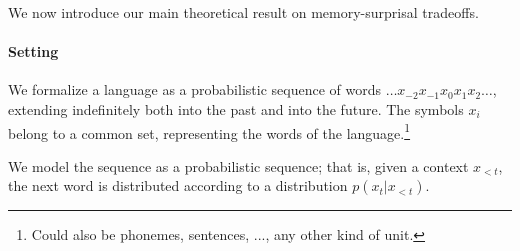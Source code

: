 \documentclass[11pt,letterpaper]{article}
\begin{document}
We now introduce our main theoretical result on memory-surprisal tradeoffs.

\paragraph{Setting}
We formalize a language as a probabilistic sequence of words $\dots x_{-2} x_{-1} x_0 x_{1} x_{2} \dots$, extending indefinitely both into the past and into the future.
The symbols $x_i$ belong to a common set, representing the words of the language.\footnote{Could also be phonemes, sentences, ..., any other kind of unit.}

We model the sequence as a probabilistic sequence; that is, given a context $x_{<t}$, the next word is distributed according to a distribution $p(x_t|x_{<t})$.



\end{document}
